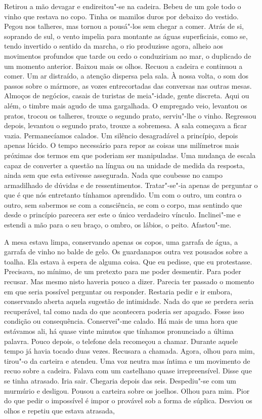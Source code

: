 Retirou a mão devagar e endireitou"-se na cadeira. Bebeu de um gole todo
o vinho que restava no copo. Tinha os mamilos duros por debaixo do
vestido. Pegou nos talheres, mas tornou a pousá"-los sem chegar a comer.
Atrás de si, soprando de sul, o vento impelia para montante as águas
superficiais, como se, tendo invertido o sentido da marcha, o rio
produzisse agora, alheio aos movimentos profundos que tarde ou cedo o
conduziriam ao mar, o duplicado de um momento anterior. Baixou mais os
olhos. Recuou a cadeira e continuou a comer. Um ar distraído, a atenção
dispersa pela sala. À nossa volta, o som dos passos sobre o mármore, as
vozes entrecortadas das conversas nas outras mesas. Almoços de negócios,
casais de turistas de meia"-idade, gente discreta. Aqui ou além, o
timbre mais agudo de uma gargalhada. O empregado veio, levantou os
pratos, trocou os talheres, trouxe o segundo prato, serviu"-lhe o vinho.
Regressou depois, levantou o segundo prato, trouxe a sobremesa. A sala
começava a ficar vazia. Permanecíamos calados. Um silêncio desagradável
a princípio, depois apenas lúcido. O tempo necessário para repor as
coisas uns milímetros mais próximas dos termos em que poderiam ser
manipuladas. Uma mudança de escala capaz de converter a questão na
língua ou na unidade de medida da resposta, ainda sem que esta estivesse
assegurada. Nada que coubesse no campo armadilhado de dúvidas e de
ressentimentos. Tratar"-se"-ia apenas de perguntar o que é que nós
entretanto tínhamos aprendido. Um com o outro, um contra o outro, sem
sabermos se com a consciência, se com o corpo, mas sentindo que desde o
princípio parecera ser este o único verdadeiro vínculo. Inclinei"-me e
estendi a mão para o seu braço, o ombro, os lábios, o peito.
Afastou"-me.

A mesa estava limpa, conservando apenas os copos, uma garrafa de água, a
garrafa de vinho no balde de gelo. Os guardanapos outra vez pousados
sobre a toalha. Ela estava à espera de alguma coisa. Que eu pedisse, que
eu protestasse. Precisava, no mínimo, de um pretexto para me poder
desmentir. Para poder recusar. Mas mesmo nisto haveria pouco a dizer.
Parecia ter passado o momento em que seria possível perguntar ou
responder. Restaria pedir e ir embora, conservando aberta aquela
sugestão de intimidade. Nada do que se perdera seria recuperável, tal
como nada do que acontecera poderia ser apagado. Fosse isso condição ou
consequência. Conservei"-me calado. Há mais de uma hora que estávamos
ali, há quase vinte minutos que tínhamos pronunciado a última palavra.
Pouco depois, o telefone dela recomeçou a chamar. Durante aquele tempo
já havia tocado duas vezes. Recusara a chamada. Agora, olhou para mim,
tirou"-o da carteira e atendeu. Uma voz neutra mas íntima e um movimento
de recuo sobre a cadeira. Falava com um castelhano quase irrepreensível.
Disse que se tinha atrasado. Iria sair. Chegaria depois das seis.
Despediu"-se com um murmúrio e desligou. Pousou a carteira sobre os
joelhos. Olhou para mim. Pior do que pedir o impossível é impor o
provável sob a forma de súplica. Desviou os olhos e repetiu que estava
atrasada,

